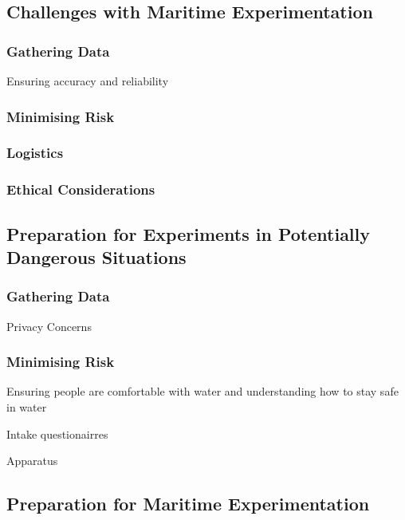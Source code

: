 \documentclass[12pt]{article}
\begin{document}
\subsection{Challenges with Maritime Experimentation}


\subsubsection{Gathering Data}

Ensuring accuracy and reliability

\subsubsection{Minimising Risk}

\subsubsection{Logistics}

\subsubsection{Ethical Considerations}



\subsection{Preparation for Experiments in Potentially Dangerous Situations}

\subsubsection{Gathering Data}

Privacy Concerns

\subsubsection{Minimising Risk}

Ensuring people are comfortable with water and understanding how to stay safe in water

Intake questionairres 

Apparatus

\subsection{Preparation for Maritime Experimentation}
\end{document}
